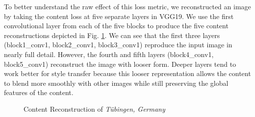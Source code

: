\documentclass{article}
\begin{document}
To better understand the raw effect of this loss metric, we reconstructed an
image by taking the content loss at five separate layers in VGG19. We use the
first convolutional layer from each of the five blocks to produce the five
content reconstructions depicted in Fig. \ref{fig:content-reconstruction}. We
can see that the first three layers (block1\_conv1, block2\_conv1,
block3\_conv1) reproduce the input image in nearly full detail. However, the
fourth and fifth layers (block4\_conv1, block5\_conv1) reconstruct the image
with looser form. Deeper layers tend to work better for style transfer because
this looser representation allows the content to blend more smoothly with
other images while still preserving the global features of the content.

\begin{figure}[htp]
\centering
\caption{Content Reconstruction of \textit{T\"{u}bingen, Germany}}
\label{fig:content-reconstruction}


\end{figure}
\end{document}
